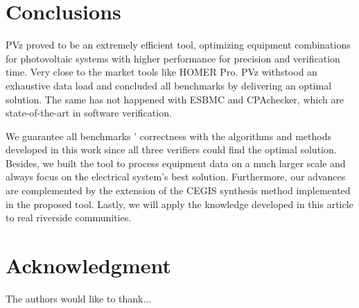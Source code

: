 \documentclass[journal]{IEEEtran}
\begin{document}
\section{Conclusions} 
PVz proved to be an extremely efficient tool, optimizing equipment combinations for photovoltaic systems with higher performance for precision and verification time. Very close to the market tools like HOMER Pro. PVz withstood an exhaustive data load and concluded all benchmarks by delivering an optimal solution. The same has not happened with ESBMC and CPAchecker, which are state-of-the-art in software verification.

We guarantee all benchmarks ' correctness with the algorithms and methods developed in this work since all three verifiers could find the optimal solution. Besides, we built the tool to process equipment data on a much larger scale and always focus on the electrical system's best solution. Furthermore, our advances are complemented by the extension of the CEGIS synthesis method implemented in the proposed tool. Lastly, we will apply the knowledge developed in this article to real riverside communities.

\section*{Acknowledgment}
The authors would like to thank...


\ifCLASSOPTIONcaptionsoff
  \newpage
\fi





%
%
%

%

\end{document}
